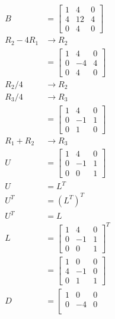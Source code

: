 \documentclass[main.tex]{subfiles}
\begin{document}
\begin{enumerate}
    $$
    \begin{aligned}
    B &= \left[\begin{array}{ccc}
    1 & 4 & 0 \\
    4 & 12 & 4 \\
    0 & 4 & 0
    \end{array}\right]\\
    R_{2} - 4 R_{1} & \rightarrow R_{2}\\
    & = \left[\begin{array}{ccc}
    1 & 4 & 0 \\
    0 & -4 & 4 \\
    0 & 4 & 0
    \end{array}\right] \\
     R_{2} / 4 & \rightarrow R_{2} \\
     R_{3} / 4 & \rightarrow R_{3} \\
    & =\left[\begin{array}{ccc}
    1 & 4 & 0 \\
    0 & -1 & 1 \\
    0 & 1 & 0
    \end{array}\right] \\
    R_{1}+R_{2} & \rightarrow R_{3}\\
    U & = \left[\begin{array}{ccc}
    1 & 4 & 0 \\
    0 & -1 & 1 \\
    0 & 0 & 1
    \end{array}\right]\\
    U &=L^{T} \\
    U^{T} &=\left(L^{T}\right)^{T} \\
    U^{T} &=L\\
    L &= \left[\begin{array}{ccc}
    1 & 4 & 0 \\
    0 & -1 & 1 \\
    0 & 0 & 1
    \end{array}\right]^{T} \\
    &=\left[\begin{array}{ccc}
    1 & 0 & 0 \\
    4 & -1 & 0 \\
    0 & 1 & 1
    \end{array}\right]\\
    D &= \left[\begin{array}{ccc}
    1 & 0 & 0 \\
    0 & -4 & 0 \\

\end{array}
\end{aligned}$$
\end{enumerate}
\end{document}
